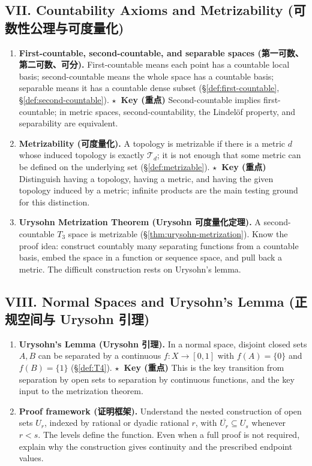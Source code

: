 \documentclass{article}
\newcommand{\reviewkey}{\textcolor{red!65!black}{\textbf{\ensuremath{\star}\ Key (重点)}}}
\begin{document}
\subsection*{VII. Countability Axioms and Metrizability (可数性公理与可度量化)}

\begin{enumerate}
  \item \textbf{First-countable, second-countable, and separable spaces
  (第一可数、第二可数、可分).} First-countable means each point has a countable
  local basis; second-countable means the whole space has a countable basis;
  separable means it has a countable dense subset
  (\S\ref{def:first-countable}, \S\ref{def:second-countable}).
  \reviewkey{} Second-countable implies first-countable; in metric spaces,
  second-countability, the Lindel\"of property, and separability are equivalent.

  \item \textbf{Metrizability (可度量化).} A topology is metrizable if there is
  a metric $d$ whose induced topology is exactly $\mathcal T_d$; it is not
  enough that some metric can be defined on the underlying set
  (\S\ref{def:metrizable}). \reviewkey{} Distinguish having a topology, having
  a metric, and having the given topology induced by a metric; infinite products
  are the main testing ground for this distinction.

  \item \textbf{Urysohn Metrization Theorem (Urysohn 可度量化定理).} A
  second-countable $T_3$ space is metrizable (\S\ref{thm:urysohn-metrization}).
  Know the proof idea: construct countably many separating functions from a
  countable basis, embed the space in a function or sequence space, and pull
  back a metric. The difficult construction rests on Urysohn's lemma.
\end{enumerate}

\subsection*{VIII. Normal Spaces and Urysohn's Lemma (正规空间与 Urysohn 引理)}

\begin{enumerate}
  \item \textbf{Urysohn's Lemma (Urysohn 引理).} In a normal space, disjoint
  closed sets $A,B$ can be separated by a continuous $f:X\to[0,1]$ with
  $f(A)=\{0\}$ and $f(B)=\{1\}$ (\S\ref{def:T4}). \reviewkey{} This is the
  key transition from separation by open sets to separation by continuous
  functions, and the key input to the metrization theorem.

  \item \textbf{Proof framework (证明框架).} Understand the nested construction
  of open sets $U_r$, indexed by rational or dyadic rational $r$, with
  $\overline{U_r}\subseteq U_s$ whenever $r<s$. The levels define the function.
  Even when a full proof is not required, explain why the construction gives
  continuity and the prescribed endpoint values.
\end{enumerate}
\end{document}
